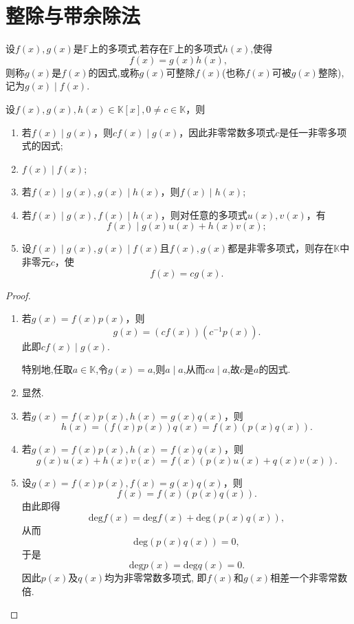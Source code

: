 \documentclass[lang=cn,newtx,10pt,scheme=chinese]{elegantbook}
\begin{document}
\section{整除与带余除法}

\begin{definition}[整除的定义]\label{definition:整除的定义}
设\(f(x),g(x)\)是\(\mathbb{F}\)上的多项式,若存在\(\mathbb{F}\)上的多项式\(h(x)\),使得
\[
f(x)=g(x)h(x),
\]
则称\(g(x)\)是\(f(x)\)的因式,或称\(g(x)\)可整除\(f(x)\)(也称\(f(x)\)可被\(g(x)\)整除),记为\(g(x)\mid f(x)\).
\end{definition}

\begin{proposition}[整除的基本性质]\label{proposition:整除的基本性质}
设\(f(x),g(x),h(x)\in\mathbb{K}[x],0\neq c\in\mathbb{K}\)，则
\begin{enumerate}[(1)]
\item 若\(f(x)\mid g(x)\)，则\(cf(x)\mid g(x)\)，因此非零常数多项式\(c\)是任一非零多项式的因式;

\item  \(f(x)\mid f(x)\);

\item 若\(f(x)\mid g(x),g(x)\mid h(x)\)，则\(f(x)\mid h(x)\);

\item 若\(f(x)\mid g(x),f(x)\mid h(x)\)，则对任意的多项式\(u(x),v(x)\)，有
\[
f(x)\mid g(x)u(x)+h(x)v(x);
\]

\item 设\(f(x)\mid g(x),g(x)\mid f(x)\)且\(f(x),g(x)\)都是非零多项式，则存在\(\mathbb{K}\)中非零元\(c\)，使
\[
f(x)=cg(x).
\]
\end{enumerate}
\end{proposition}
\begin{proof}
\begin{enumerate}[(1)]
\item 若\(g(x)=f(x)p(x)\)，则
\[
g(x)=(cf(x))(c^{-1}p(x)).
\]
此即\(cf(x)\mid g(x)\).

特别地,任取$a\in \mathbb{K}$,令$g(x)=a$,则$a\mid a$,从而$ca \mid a$,故$c$是$a$的因式.

\item 显然.

\item 若\(g(x)=f(x)p(x),h(x)=g(x)q(x)\)，则
\[
h(x)=(f(x)p(x))q(x)=f(x)(p(x)q(x)).
\]

\item 若\(g(x)=f(x)p(x),h(x)=f(x)q(x)\)，则
\[
g(x)u(x)+h(x)v(x)=f(x)(p(x)u(x)+q(x)v(x)).
\]

\item 设\(g(x)=f(x)p(x),f(x)=g(x)q(x)\)，则
\[
f(x)=f(x)(p(x)q(x)).
\]
由此即得
\[
\mathrm{deg }f(x)=\mathrm{deg }f(x)+\mathrm{deg}(p(x)q(x)),
\]
从而
\[
\mathrm{deg}(p(x)q(x)) = 0,
\]
于是
\[
\mathrm{deg }p(x)=\mathrm{deg }q(x)=0.
\]
因此\(p(x)\)及\(q(x)\)均为非零常数多项式, 即\(f(x)\)和\(g(x)\)相差一个非零常数倍.
\end{enumerate}
\end{proof}
\end{document}

